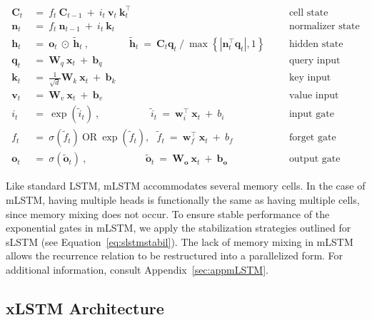 \begin{align}
\label{eq:mlstm_recurrent_begin}
\mathbf{C}_t \ &= \  f_t \ \mathbf{C}_{t-1} \ + \ 
  i_t \ \mathbf{v}_t \ \mathbf{k}_t^\top & &  &\text{cell state} \\
\mathbf{n}_t \ &= \  f_t \ \mathbf{n}_{t-1} \ + \ 
  i_t \ \mathbf{k}_t & &  &\text{normalizer state} \\
\mathbf{h}_t  \ &= \ \mathbf{o}_t \ \odot \ \tilde{\mathbf{h}}_t
\ , \qquad \qquad 
\tilde{\mathbf{h}}_t \ = \   \mathbf{C}_t \mathbf{q}_t \ / \ 
  \max \left\{ |\mathbf{n}_t^\top \mathbf{q}_t|, 1 \right\} 
   &&&\text{hidden state} \\
\mathbf{q}_t \ &= \ \mathbf{W}_q \ \mathbf{x}_t \ + \ \mathbf{b}_q  & &  &\text{query input} \\
\mathbf{k}_t \ &= \ \frac{1}{\sqrt{d}} \mathbf{W}_k \ \mathbf{x}_t \ + \ \mathbf{b}_k  & &  &\text{key input} \\
\mathbf{v}_t \ &= \ \mathbf{W}_v \ \mathbf{x}_t \ + \ \mathbf{b}_v  & &  &\text{value input} \\
i_t \ &= \ \!\exp \!  \! \left( \tilde{i}_t  \right) \ , 
 \qquad \qquad \ \ \ \ \,
  \tilde{i}_t \ = \ \mathbf{w}^\top_{i} \ \mathbf{x}_t \ + \  b_{i} \ \ \ 
  &&&\text{input gate} \\
f_t \ &= \ \sigma \!  \left(  \tilde{f}_t \right) \ \text{OR} \ \!\exp \!  \! \left(  \tilde{f}_t \right) , \ \ \: \!
\tilde{f}_t \ = \ \mathbf{w}^\top_{f} \ \mathbf{x}_t  \ + \
  b_{f}
  &&& \text{forget gate} \\
\label{eq:mlstm_recurrent_end}
\mathbf{o}_t \ &= \ \sigma \left( \tilde{\mathbf{o}}_t \right) \ , \qquad \qquad \quad \ \ \ \,
  \tilde{\mathbf{o}}_t  \ = \ \mathbf{W}_{\mathbf{o}} \ \mathbf{x}_t \ + \
  \mathbf{b}_{\mathbf{o}}
  &&&\text{output gate} 
\end{align}

Like standard LSTM, mLSTM accommodates several memory cells. In the case of mLSTM, having multiple heads is functionally the same as having multiple cells, since memory mixing does not occur. To ensure stable performance of the exponential gates in mLSTM, we apply the stabilization strategies outlined for sLSTM (see Equation~\ref{eq:slstmstabil}). The lack of memory mixing in mLSTM allows the recurrence relation to be restructured into a parallelized form. For additional information, consult Appendix~\ref{sec:appmLSTM}.

\subsection{xLSTM Architecture}
\label{sec:xLSTMarch}


